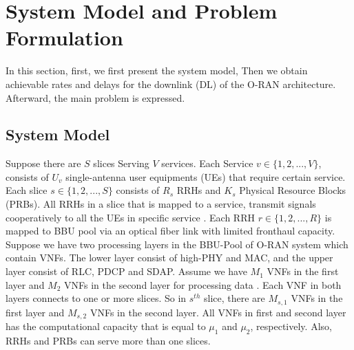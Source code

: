 \documentclass[conference]{IEEEtran}
\begin{document}
\section{System Model and Problem Formulation}\label{systemmodel}
In this section, first, we first present the system model, Then we obtain achievable rates and delays for the downlink (DL) of the O-RAN architecture.
Afterward, the main problem is expressed.
\subsection{System Model}
Suppose there are $S$ slices Serving $V$ services. Each Service $v\in \{1,2,...,V \} $, consists of $U_v$ single-antenna user equipments (UEs) that require certain service. Each slice $s \in \{1,2,...,S \}$ consists of $R_s$ RRHs and $K_s$ Physical Resource Blocks (PRBs). All RRHs in a slice that is mapped to a service, transmit signals cooperatively to all the UEs in specific service \cite{motalleb2017optimal,mimoCran}. Each RRH $r \in \{1,2,...,R \}$ is mapped to BBU pool via an optical fiber link with limited fronthaul capacity.
Suppose we have two processing layers in the BBU-Pool of O-RAN system which contain VNFs. The lower layer consist of high-PHY and MAC, and the upper layer consist of RLC, PDCP and SDAP.
Assume we have $M_1$ VNFs in the first layer and $M_2$ VNFs in the second layer for processing data .
Each VNF in both layers connects to one or more slices. So in $s^{th}$ slice, there are $M_{s,1}$ VNFs in the first layer and $M_{s,2}$ VNFs in the second layer. All VNFs in first and second layer has the computational capacity that is  equal to $\mu_1$ and $\mu_2$, respectively. 
Also, RRHs and PRBs can serve more than one slices. 
\end{document}
